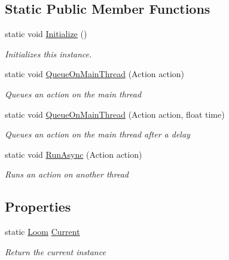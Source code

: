 \subsection*{Static Public Member Functions}
\begin{DoxyCompactItemize}
\item 
static void \hyperlink{class_loom_aa8179ae2588826a3feb739b2540e710a}{Initialize} ()
\begin{DoxyCompactList}\small\item\em Initializes this instance. \end{DoxyCompactList}\item 
static void \hyperlink{class_loom_a0d38a65c449aacb444a14074f3d62574}{Queue\+On\+Main\+Thread} (Action action)
\begin{DoxyCompactList}\small\item\em Queues an action on the main thread \end{DoxyCompactList}\item 
static void \hyperlink{class_loom_a9003659e5b32d18ddb3c9204dcff343f}{Queue\+On\+Main\+Thread} (Action action, float time)
\begin{DoxyCompactList}\small\item\em Queues an action on the main thread after a delay \end{DoxyCompactList}\item 
static void \hyperlink{class_loom_a96dca2cf633909a32613b23bf7006f80}{Run\+Async} (Action action)
\begin{DoxyCompactList}\small\item\em Runs an action on another thread \end{DoxyCompactList}\end{DoxyCompactItemize}
\subsection*{Properties}
\begin{DoxyCompactItemize}
\item 
static \hyperlink{class_loom}{Loom} \hyperlink{class_loom_a755c2c53122fe9c9a7447699f6fa27b8}{Current}
\begin{DoxyCompactList}\small\item\em Return the current instance \end{DoxyCompactList}\end{DoxyCompactItemize}


